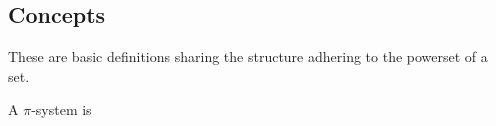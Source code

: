 \subsection{Concepts}

These are basic definitions sharing the structure adhering to the powerset of a set.

\begin{theorem}
  A \(\pi\)-system is
\end{theorem}